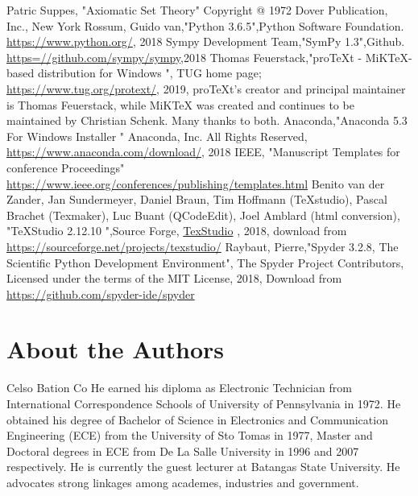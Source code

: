 \documentclass[10pt,journal]{IEEEtran}
\begin{document}
\begin{thebibliography}{00} 
 Patric Suppes, "Axiomatic Set Theory" Copyright @ 1972     Dover Publication, Inc., New York Rossum, Guido van,"Python 3.6.5",Python Software Foundation.     \url{https://www.python.org/}, 2018  Sympy Development Team,"SymPy 1.3",Github.     \url{https=//github.com/sympy/sympy},2018  Thomas Feuerstack,"proTeXt - MiKTeX-based distribution for Windows ",    TUG home page; \url{https://www.tug.org/protext/}, 2019, proTeXt's creator     and principal maintainer is Thomas Feuerstack, while MiKTeX was created     and continues to be maintained by Christian Schenk. Many thanks to both.  Anaconda,"Anaconda 5.3 For Windows Installer "     Anaconda, Inc. All Rights Reserved, \url{https://www.anaconda.com/download/},    2018  IEEE, "Manuscript Templates for conference Proceedings"    \url{https://www.ieee.org/conferences/publishing/templates.html}  Benito van der Zander, Jan Sundermeyer, Daniel Braun,         Tim Hoffmann (TeXstudio), Pascal Brachet (Texmaker),         Luc Buant (QCodeEdit), Joel Amblard (html conversion),        "TeXStudio 2.12.10 ",Source Forge, \href{https://www.texstudio.org/} {TexStudio} ,        2018, download from \url{https://sourceforge.net/projects/texstudio/}  Raybaut, Pierre,"Spyder 3.2.8, The Scientific Python Development     Environment", The Spyder Project Contributors, Licensed under the terms of     the MIT License, 2018, Download from \url{https://github.com/spyder-ide/spyder}\end{thebibliography} 

\section*{About the Authors} 
\begin{IEEEbiography}{Celso Bation Co} He earned his diploma as Electronic Technician from International        Correspondence Schools of University of Pennsylvania in 1972. He obtained        his degree of Bachelor of Science in Electronics and Communication        Engineering (ECE) from the University of Sto Tomas in 1977, Master         and Doctoral degrees in ECE from De La Salle University in 1996 and        2007 respectively. He is currently the guest lecturer at Batangas        State University. He advocates strong linkages among academes, industries        and government.\end{IEEEbiography} 
\end{document}

